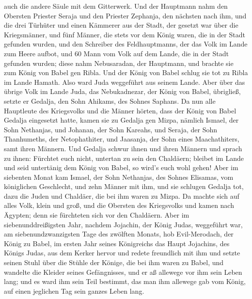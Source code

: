 auch die andere Säule mit dem Gitterwerk.  Und der
Hauptmann nahm den Obersten Priester Seraja und den Priester Zephanja,
den nächsten nach ihm, und die drei Türhüter  und einen
Kämmerer aus der Stadt, der gesetzt war über die Kriegsmänner, und fünf
Männer, die stets vor dem König waren, die in der Stadt gefunden wurden,
und den Schreiber des Feldhauptmanns, der das Volk im Lande zum Heere
aufbot, und 60 Mann vom Volk auf dem Lande, die in der Stadt gefunden
wurden;  diese nahm Nebusaradan, der Hauptmann, und brachte
sie zum König von Babel gen Ribla.  Und der König von Babel
schlug sie tot zu Ribla im Lande Hamath. Also ward Juda weggeführt aus
seinem Lande.  Aber über das übrige Volk im Lande Juda, das
Nebukadnezar, der König von Babel, übrigließ, setzte er Gedalja, den
Sohn Ahikams, des Sohnes Saphans.  Da nun alle Hauptleute
des Kriegsvolks und die Männer hörten, dass der König von Babel Gedalja
eingesetzt hatte, kamen sie zu Gedalja gen Mizpa, nämlich Ismael, der
Sohn Nethanjas, und Johanan, der Sohn Kareahs, und Seraja, der Sohn
Thanhumeths, der Netophathiter, und Jaasanja, der Sohn eines
Maachathiters, samt ihren Männern.  Und Gedalja schwur
ihnen und ihren Männern und sprach zu ihnen: Fürchtet euch nicht,
untertan zu sein den Chaldäern; bleibet im Lande und seid untertänig dem
König von Babel, so wird's euch wohl gehen!  Aber im
siebenten Monat kam Ismael, der Sohn Nethanjas, des Sohnes Elisamas, vom
königlichen Geschlecht, und zehn Männer mit ihm, und sie schlugen
Gedalja tot, dazu die Juden und Chaldäer, die bei ihm waren zu Mizpa.
 Da machte sich auf alles Volk, klein und groß, und die
Obersten des Kriegsvolks und kamen nach Ägypten; denn sie fürchteten
sich vor den Chaldäern.  Aber im siebenunddreißigsten Jahr,
nachdem Jojachin, der König Judas, weggeführt war, am
siebenundzwanzigsten Tage des zwölften Monats, hob Evil-Merodach, der
König zu Babel, im ersten Jahr seines Königreichs das Haupt Jojachins,
des Königs Judas, aus dem Kerker hervor  und redete
freundlich mit ihm und setzte seinen Stuhl über die Stühle der Könige,
die bei ihm waren zu Babel,  und wandelte die Kleider
seines Gefängnisses, und er aß allewege vor ihm sein Leben lang;
 und es ward ihm sein Teil bestimmt, das man ihm allewege
gab vom König, auf einen jeglichen Tag sein ganzes Leben lang.
